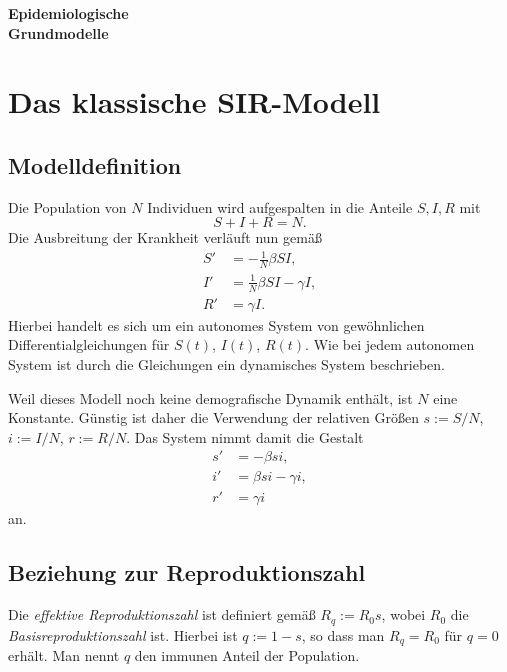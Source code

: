 \documentclass[a4paper,10pt,fleqn,twocolumn,twoside,dvipdfmx]{scrartcl}
\numberwithin{equation}{section}
\begin{document}

\noindent
{\huge\textbf{Epidemiologische\\
Grundmodelle}\par}

\tableofcontents

\section{Das klassische SIR-Modell}
\subsection{Modelldefinition}

Die Population von $N$ Individuen wird aufgespalten in die Anteile
$S,I,R$ mit%
\begin{equation}
S+I+R=N.
\end{equation}
Die Ausbreitung der Krankheit verläuft nun gemäß%
\begin{align}
S' &= -\tfrac{1}{N} \beta SI,\\
I' &= \tfrac{1}{N} \beta SI - \gamma I,\\
R' &= \gamma I.
\end{align}
Hierbei handelt es sich um ein autonomes System von gewöhnlichen
Differentialgleichungen für $S(t)$, $I(t)$, $R(t)$.
Wie bei jedem autonomen System ist durch die Gleichungen ein
dynamisches System beschrieben.

Weil dieses Modell noch keine demografische Dynamik enthält,
ist $N$ eine Konstante. Günstig ist daher die Verwendung der
relativen Größen $s:=S/N$, $i:=I/N$, $r:=R/N$. Das System nimmt
damit die Gestalt%
\begin{align}
\label{eq:sir-s} s' &= -\beta si,\\
\label{eq:sir-i} i' &= \beta si - \gamma i,\\
\label{eq:sir-r} r' &= \gamma i
\end{align}
an.

\subsection{Beziehung zur Reproduktionszahl}

Die \emph{effektive Reproduktionszahl} ist definiert gemäß
$R_q := R_0 s$, wobei $R_0$ die \emph{Basisreproduktionszahl} ist.
Hierbei ist $q:=1-s$, so dass man $R_q=R_0$ für $q=0$ erhält. Man nennt
$q$ den immunen Anteil der Population.
\end{document}
